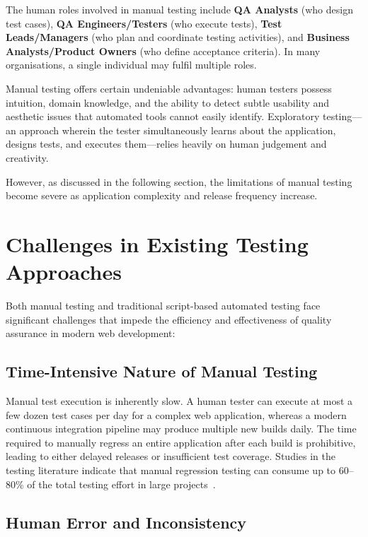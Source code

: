 The human roles involved in manual testing include \textbf{QA Analysts} (who design test cases), \textbf{QA Engineers/Testers} (who execute tests), \textbf{Test Leads/Managers} (who plan and coordinate testing activities), and \textbf{Business Analysts/Product Owners} (who define acceptance criteria). In many organisations, a single individual may fulfil multiple roles.

Manual testing offers certain undeniable advantages: human testers possess intuition, domain knowledge, and the ability to detect subtle usability and aesthetic issues that automated tools cannot easily identify. Exploratory testing---an approach wherein the tester simultaneously learns about the application, designs tests, and executes them---relies heavily on human judgement and creativity.

However, as discussed in the following section, the limitations of manual testing become severe as application complexity and release frequency increase.


\section{Challenges in Existing Testing Approaches}
\label{sec:challenges}

Both manual testing and traditional script-based automated testing face significant challenges that impede the efficiency and effectiveness of quality assurance in modern web development:

\subsection{Time-Intensive Nature of Manual Testing}
\label{subsec:time_intensive}

Manual test execution is inherently slow. A human tester can execute at most a few dozen test cases per day for a complex web application, whereas a modern continuous integration pipeline may produce multiple new builds daily. The time required to manually regress an entire application after each build is prohibitive, leading to either delayed releases or insufficient test coverage. Studies in the testing literature indicate that manual regression testing can consume up to 60--80\% of the total testing effort in large projects~\cite{istqb2023}.

\subsection{Human Error and Inconsistency}
\label{subsec:human_error}

